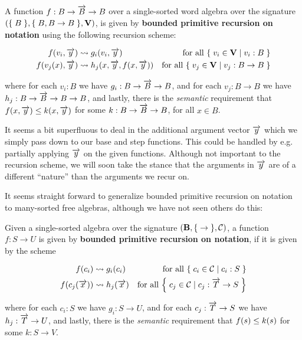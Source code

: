 \begin{specification} A function $f : B \rightarrow \overrightarrow{B} \rightarrow B$
over a single-sorted word algebra over the signature ${\mathopen{}\left({\mathopen{}\left\{\mathrel{}{B}\mathrel{}\right\}\mathclose{},\mathopen{}\left\{\mathrel{}{B, B
\rightarrow B}\mathrel{}\right\}\mathclose{},\mathbf{V}}\right)\mathclose{}}$, is given by \textbf{bounded primitive recursion on
notation} using the following recursion scheme:
 
\begin{align}
%
f\p{v_i, \vect{y}} &\leadsto g_i\p{v_i, \vect{y}} & \text{for all $\set{v_i \in
\mathbf{V} \st{ v_i : B}}$} \\
%
f\p{v_j\p{x}, \vect{y}} &\leadsto h_j\p{x, \vect{y}, f\p{x, \vect{y}}} &
\text{for all $\set{v_j \in \mathbf{V} \st{ v_j : B \rightarrow B}}$}
%
\end{align}

where for each $v_i : B$ we have $g_i : B \rightarrow \overrightarrow{B} \rightarrow B$,
and for each $v_j : B \rightarrow B$ we have $h_j : B \rightarrow \overrightarrow{B}
\rightarrow B \rightarrow B$, and lastly, there is the \emph{semantic}
requirement that $f{\mathopen{}\left({x,\overrightarrow{y}}\right)\mathclose{}} \leq k{\mathopen{}\left({x,\overrightarrow{y}}\right)\mathclose{}}$ for some $k : B
\rightarrow \overrightarrow{B} \rightarrow B$, for all $x \in B$.

\end{specification}

\begin{remark} It seems a bit superfluous to deal in the additional argument
vector $\overrightarrow{y}$ which we simply pass down to our base and step functions.
This could be handled by e.g. partially applying $\overrightarrow{y}$ on the given
functions.  Although not important to the recursion scheme, we will soon take
the stance that the arguments in $\overrightarrow{y}$ are of a different ``nature'' than
the arguments we recur on.\end{remark}

It seems straight forward to generalize bounded primitive recursion on notation
to many-sorted free algebras, although we have not seen others do this:

\begin{specification} Given a single-sorted algebra over the signature
${\mathopen{}\left({\mathbf{B},\mathopen{}\left\{\mathrel{}{\rightarrow}\mathrel{}\right\}\mathclose{},\mathcal{C}}\right)\mathclose{}}$, a function $f : S \rightarrow
U$ is given by \textbf{bounded primitive recursion on notation}, if it is given
by the scheme

\begin{align}
%
f\p{c_i} &\leadsto g_i\p{c_i} & \text{for all $\set{c_i \in \mathcal{C} \st{ c_i :
S}}$} \\
%
f\p{c_j\p{\vect{x}}} &\leadsto h_j\p{\vect{x}} & \text{for all $\set{c_j \in
\mathcal{C} \st{ c_j : \vect{T} \rightarrow S}}$}
%
\end{align}

where for each $c_i : S$ we have $g_i : S \rightarrow U$, and for each $c_j :
\overrightarrow{T} \rightarrow S$ we have $h_j : \overrightarrow{T} \rightarrow U$, and lastly,
there is the \emph{semantic} requirement that $f{\mathopen{}\left({s}\right)\mathclose{}} \leq k{\mathopen{}\left({s}\right)\mathclose{}}$ for some $k
: S \rightarrow V$.

\end{specification}

